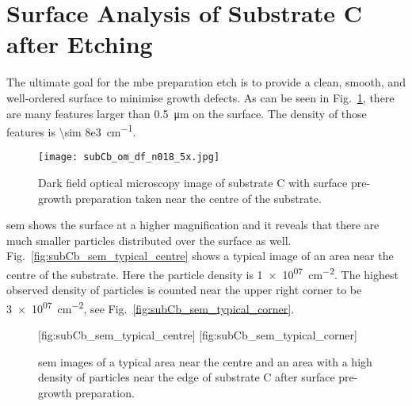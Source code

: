 \clearpage

\section{Surface Analysis of Substrate C after Etching}

The ultimate goal for the \ac{mbe} preparation etch is to provide a clean, smooth, and well-ordered surface to minimise growth defects. As can be seen in Fig.~\ref{fig:subCb_om_df}, there are many features larger than \SI{0.5}{\micro\metre} on the surface. The density of those features is \SI{\sim 8e3}{\centi\metre^{-1}}. 

\begin{figure}[htbp]
    \centering
    \texttt{[image: subCb\_om\_df\_n018\_5x.jpg]}
    \caption[Dark field optical microscopy image of substrate C with surface pre-growth preparation.]{Dark field optical microscopy image of substrate C with surface pre-growth preparation taken near the centre of the substrate.}\label{fig:subCb_om_df}
\end{figure}

\Ac{sem} shows the surface at a higher magnification and it reveals that there are much smaller particles distributed over the surface as well. Fig.~\ref{fig:subCb_sem_typical_centre} shows a typical image of an area near the centre of the substrate. Here the particle density is  \SI{1e+07}{\centi\metre^{-2}}. The highest observed density of particles is counted near the upper right corner to be \SI{3e+07}{\centi\metre^{-2}}, see Fig.~\ref{fig:subCb_sem_typical_corner}. 

\begin{figure}[htbp]
    [fig:subCb_sem_typical_centre]
    \hfill
    [fig:subCb_sem_typical_corner]
    \caption[\Ac{sem} images of typical areas on substrate C with surface pre-growth preparation.]{\Ac{sem} images of  a typical area near the centre and  an area with a high density of particles near the edge of substrate C after surface pre-growth preparation.}\label{fig:subCb_sem_typical}
\end{figure}

